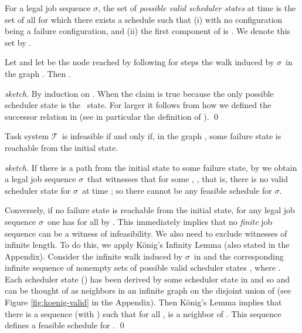 \documentclass{llncs}
\newcommand{\tsys}{\ensuremath{\mathcal{T}}}
\newcommand{\seq}{\ensuremath{\sigma}}
\begin{document}
\newcommand{\valid}{\ensuremath{\mathrm{valid}}}
\begin{definition}
For a legal job sequence \seq, the set of \emph{possible valid scheduler states} at time  is the set of all  for which there exists a schedule  such that (i)  with no configuration  being a failure configuration, and (ii) the first component of  is . We denote this set by . 
\end{definition}

\begin{lemma}
\label{lem:graph-step}
Let  and let  be the node reached by following for  steps the walk induced by \seq\ in the graph . Then . 
\end{lemma}
\begin{proof}[sketch]
By induction on . When  the claim is true because the only possible scheduler state is the \zero\ state. For larger  it follows from how we defined the successor relation in  (see in particular the definition of ). 
\qed
\end{proof}


\begin{lemma}
\label{lem:reachability}
Task system \tsys\ is infeasible if and only if, in the graph , some failure state is reachable from the initial state.  
\end{lemma}
\begin{proof}[sketch]
If there is a path from the initial state to some failure state, by  we obtain a legal job sequence \seq\ that witnesses that for some , , that is, there is no valid scheduler state for \seq\ at time ; so there cannot be any feasible schedule for \seq. 

Conversely, if no failure state is reachable from the initial state, for any legal job sequence \seq\ one has  for all  by . This immediately implies that no \emph{finite} job sequence can be a witness of infeasibility. We also need to exclude witnesses of infinite length. To do this, we apply K\"onig's Infinity Lemma \cite[Lemma 8.1.2]{Diestel:2005} (also stated in the Appendix). Consider the infinite walk induced by \seq\ in  and the corresponding infinite sequence of nonempty sets of possible valid scheduler states , where . Each scheduler state  () has been derived by some scheduler state in  and so  and  can be thought of as neighbors in an infinite graph on the disjoint union of  (see Figure \ref{fig:koenig-valid} in the Appendix). Then K\"onig's Lemma implies that there is a sequence  (with ) such that for all ,  is a neighbor of . This sequence defines a feasible schedule for .
\qed 
\end{proof}
\end{document}
